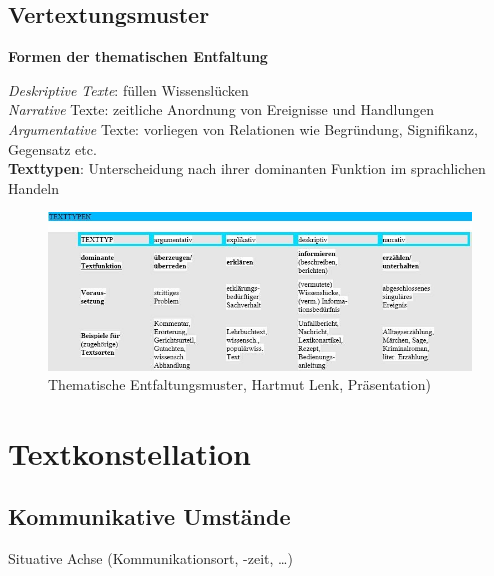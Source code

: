 \documentclass[
  letterpaper,
]{scrbook}
\begin{document}
\hypertarget{vertextungsmuster}{%
\section{Vertextungsmuster}\label{vertextungsmuster}}

\textbf{Formen der thematischen Entfaltung}

\emph{Deskriptive Texte}: füllen Wissenslücken\\
\emph{Narrative} Texte: zeitliche Anordnung von Ereignisse und
Handlungen\\
\emph{Argumentative} Texte: vorliegen von Relationen wie Begründung,
Signifikanz, Gegensatz etc.\\

\textbf{Texttypen}: Unterscheidung nach ihrer dominanten Funktion im
sprachlichen Handeln\\

\begin{figure}

{\centering \includegraphics[width=1\textwidth,height=\textheight]{./pictures/thematische_entfaltung.jpg}

}

\caption{Thematische Entfaltungsmuster, Hartmut Lenk, Präsentation)}

\end{figure}

\hypertarget{textkonstellation}{%
\chapter{Textkonstellation}\label{textkonstellation}}

\hypertarget{kommunikative-umstuxe4nde}{%
\section{Kommunikative Umstände}\label{kommunikative-umstuxe4nde}}

Situative Achse (Kommunikationsort, -zeit, \ldots)
\end{document}
